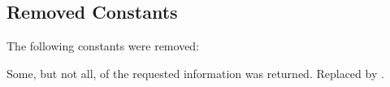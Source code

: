 %
%
%
%
%
%
%
%
%

\subsection{Removed Constants}

The following constants were removed:

\begin{constantdesc}
Some, but not all, of the requested information was returned.
Replaced by .
\end{constantdesc}

%


